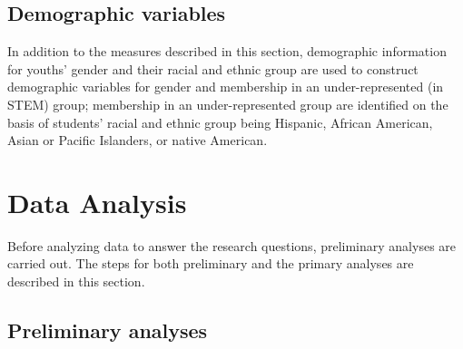 \documentclass[]{msu-thesis}
\theoremstyle{definition}
\theoremstyle{definition}
\theoremstyle{definition}
\theoremstyle{remark}
\begin{document}
\begin{table}

\caption{\label{tab:unnamed-chunk-7}Coding Frame for Instructional Support for Work With Data}
\centering
{}
\end{table}

\subsection{Demographic variables}\label{demographic-variables}

In addition to the measures described in this section, demographic
information for youths' gender and their racial and ethnic group are
used to construct demographic variables for gender and membership in an
under-represented (in STEM) group; membership in an under-represented
group are identified on the basis of students' racial and ethnic group
being Hispanic, African American, Asian or Pacific Islanders, or native
American.

\section{Data Analysis}\label{data-analysis}

Before analyzing data to answer the research questions, preliminary
analyses are carried out. The steps for both preliminary and the primary
analyses are described in this section.

\subsection{Preliminary analyses}\label{preliminary-analyses}
\end{document}
